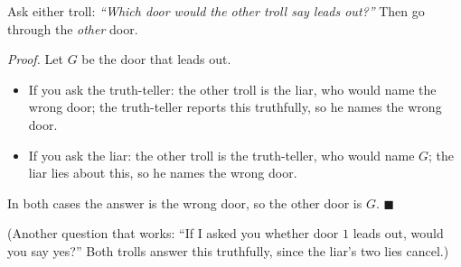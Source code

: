 Ask either troll: \emph{``Which door would the other troll say leads out?''} Then go through the \emph{other} door.

\emph{Proof.} Let $G$ be the door that leads out.
\begin{itemize}
\item If you ask the truth-teller: the other troll is the liar, who would name the wrong door; the truth-teller reports this truthfully, so he names the wrong door.
\item If you ask the liar: the other troll is the truth-teller, who would name $G$; the liar lies about this, so he names the wrong door.
\end{itemize}
In both cases the answer is the wrong door, so the other door is $G$. $\blacksquare$

(Another question that works: ``If I asked you whether door $1$ leads out, would you say yes?'' Both trolls answer this truthfully, since the liar's two lies cancel.)
